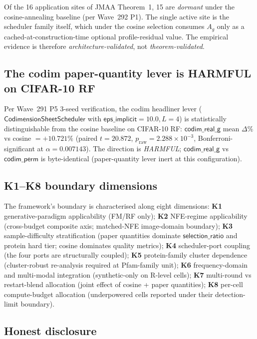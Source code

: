\documentclass[journal,twocolumn,final]{IEEEtran}
\newcommand{\pr}{p_{\mathrm{raw}}}
\newcommand{\sheetA}{A_g}
\begin{document}
Of the 16 application sites of JMAA Theorem~1, 15 are \emph{dormant} under the
cosine-annealing baseline (per Wave~292 P1). The single active site is the
scheduler family itself, which under the cosine selection consumes $\sheetA$
only as a cached-at-construction-time optional profile-residual value. The
empirical evidence is therefore \emph{architecture-validated}, not
\emph{theorem-validated}.

\subsection*{The codim paper-quantity lever is HARMFUL on CIFAR-10 RF}

Per Wave~291 P5 3-seed verification, the codim headliner lever
($\mathsf{CodimensionSheetScheduler}$ with $\mathsf{eps\_implicit}=10.0, L=4$)
is statistically distinguishable from the cosine baseline on CIFAR-10 RF:
$\mathsf{codim\_real\_g}$ mean $\Delta\%$ vs cosine $= +10.721\%$ (paired
$t = 20.872$, $\pr = 2.288\!\times\!10^{-3}$, Bonferroni-significant at $\alpha
= 0.007143$). The direction is \emph{HARMFUL}; $\mathsf{codim\_real\_g}$ vs
$\mathsf{codim\_perm}$ is byte-identical (paper-quantity lever inert at this
configuration).

\subsection*{K1--K8 boundary dimensions}

The framework's boundary is characterised along eight dimensions: \textbf{K1}
generative-paradigm applicability (FM/RF only); \textbf{K2} NFE-regime
applicability (cross-budget composite axis; matched-NFE image-domain boundary);
\textbf{K3} sample-difficulty stratification (paper quantities dominate
$\mathsf{selection\_ratio}$ and protein hard tier; cosine dominates quality
metrics); \textbf{K4} scheduler-port coupling (the four ports are structurally
coupled); \textbf{K5} protein-family cluster dependence (cluster-robust
re-analysis required at Pfam-family unit); \textbf{K6} frequency-domain and
multi-modal integration (synthetic-only on R-level cells); \textbf{K7}
multi-round vs restart-blend allocation (joint effect of cosine + paper
quantities); \textbf{K8} per-cell compute-budget allocation (underpowered cells
reported under their detection-limit boundary).

\subsection*{Honest disclosure}
\end{document}
